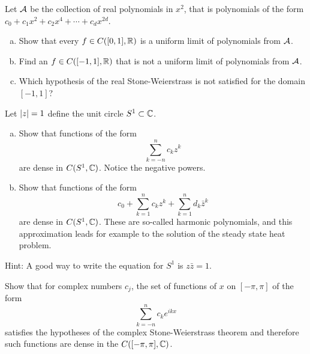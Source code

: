 \begin{exercise}
Let ${\mathcal{A}}$ be the collection of real polynomials in $x^2$,
that is polynomials of the form
$c_0 + c_1 x^2 + c_2 x^4 + \cdots + c_d x^{2d}$.
\begin{enumerate}[a)]
\item
Show that every $f \in C([0,1],{\mathbb{R}})$ is a uniform limit of
polynomials from ${\mathcal{A}}$.
\item
Find an $f \in  C([-1,1],{\mathbb{R}})$ that is not a
uniform limit of
polynomials from ${\mathcal{A}}$.
\item
Which hypothesis of the real Stone-Weierstrass is not satisfied
for the domain $[-1,1]$?
\end{enumerate}
\end{exercise}

\pagebreak[2]
\begin{exercise}
Let $\lvert {z} \rvert=1$ define the unit circle $S^1 \subset {\mathbb{C}}$.
\begin{enumerate}[a)]
\item
Show that functions of the form
\begin{equation*}
\sum_{k=-n}^n c_k z^k
\end{equation*}
are dense in $C(S^1,{\mathbb{C}})$.  Notice the negative powers.
\item 
Show that functions of the form
\begin{equation*}
c_0
+
\sum_{k=1}^n c_k z^k
+
\sum_{k=1}^n d_k \bar{z}^k
\end{equation*}
are dense in $C(S^1,{\mathbb{C}})$.  These are so-called harmonic polynomials,
and this approximation leads for example to the solution of the
steady state heat problem.
\end{enumerate}
Hint: A good way to write the equation for $S^1$ is $z \bar{z} = 1$.
\end{exercise}

\pagebreak[1]
\begin{exercise}
Show that for complex numbers $c_j$, the set of functions
of $x$ on $[-\pi,\pi]$
of the form
\begin{equation*}
\sum_{k=-n}^n c_k e^{ik x}
\end{equation*}
satisfies the hypotheses of the complex Stone-Weierstrass theorem
and therefore such functions are dense in the $C([-\pi,\pi],{\mathbb{C}})$.
\end{exercise}


